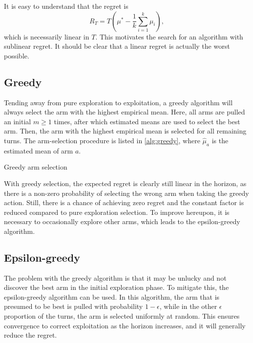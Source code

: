 It is easy to understand that the regret is
\begin{equation}
    R_T = T\left(\mu^* - \frac{1}{k}\sum_{i=1}^k \mu_i\right),
\end{equation}
which is necessarily linear in $T$.
This motivates the search for an algorithm with sublinear regret.
It should be clear that a linear regret is actually the worst possible.

\subsection{Greedy}
Tending away from pure exploration to exploitation, a greedy algorithm will always select the arm with the highest empirical mean.
Here, all arms are pulled an initial $m \geq 1$ times, after which estimated means are used to select the best arm.
Then, the arm with the highest empirical mean is selected for all remaining turns.
The arm-selection procedure is listed in \cref{alg:greedy}, where $\hat{\mu}_a$ is the estimated mean of arm $a$.

\begin{algorithm}
    \caption{Greedy arm selection}
    \label{alg:greedy}
     
\end{algorithm}


With greedy selection, the expected regret is clearly still linear in the horizon, as there is a non-zero probability of selecting the wrong arm when taking the greedy action.
Still, there is a chance of achieving zero regret and the constant factor is reduced compared to pure exploration selection.
To improve hereupon, it is necessary to occasionally explore other arms, which leads to the epsilon-greedy algorithm.

\subsection{Epsilon-greedy}
The problem with the greedy algorithm is that it may be unlucky and not discover the best arm in the initial exploration phase.
To mitigate this, the epsilon-greedy algorithm can be used.
In this algorithm, the arm that is presumed to be best is pulled with probability $1-\epsilon$, while in the other $\epsilon$ proportion of the turns, the arm is selected uniformly at random.
This ensures convergence to correct exploitation as the horizon increases, and it will generally reduce the regret.

